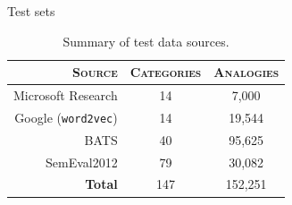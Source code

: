 \documentclass{beamer}
\begin{document}
\begin{frame}{Test sets}

\begin{table}
\begin{tabular}{|r|c|c|}
\hline
\small{\textsc{Source}} & \small{\textsc{Categories}} & \small{\textsc{Analogies}} \\
\hline
\hline
Microsoft Research & 14 & 7,000 \\
Google (\texttt{word2vec}) & 14 & 19,544 \\
BATS & 40 & 95,625 \\
SemEval2012 & 79 & 30,082 \\
\hline
\textbf{Total} & 147 & 152,251 \\
\hline
\end{tabular}
\caption{\label{datasources} Summary of test data sources.}
\end{table}


\end{frame}
\end{document}
